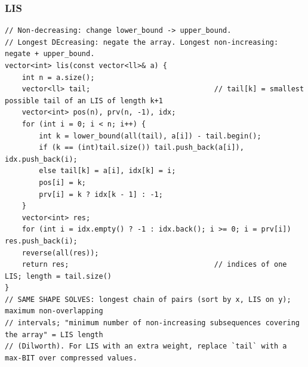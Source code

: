 \documentclass[9pt,a4paper,twocolumn]{extarticle}
\begin{document}
\subsubsection{LIS}
\nopagebreak
\begin{lstlisting}
// Non-decreasing: change lower_bound -> upper_bound.
// Longest DEcreasing: negate the array. Longest non-increasing: negate + upper_bound.
vector<int> lis(const vector<ll>& a) {
    int n = a.size();
    vector<ll> tail;                             // tail[k] = smallest possible tail of an LIS of length k+1
    vector<int> pos(n), prv(n, -1), idx;
    for (int i = 0; i < n; i++) {
        int k = lower_bound(all(tail), a[i]) - tail.begin();
        if (k == (int)tail.size()) tail.push_back(a[i]), idx.push_back(i);
        else tail[k] = a[i], idx[k] = i;
        pos[i] = k;
        prv[i] = k ? idx[k - 1] : -1;
    }
    vector<int> res;
    for (int i = idx.empty() ? -1 : idx.back(); i >= 0; i = prv[i]) res.push_back(i);
    reverse(all(res));
    return res;                                  // indices of one LIS; length = tail.size()
}
// SAME SHAPE SOLVES: longest chain of pairs (sort by x, LIS on y); maximum non-overlapping
// intervals; "minimum number of non-increasing subsequences covering the array" = LIS length
// (Dilworth). For LIS with an extra weight, replace `tail` with a max-BIT over compressed values.
\end{lstlisting}

\filbreak
\end{document}
